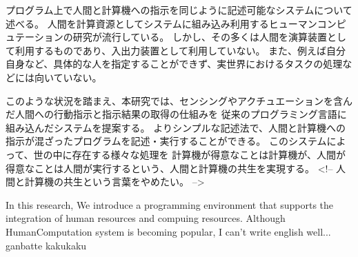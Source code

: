 \begin{jabstract}

プログラム上で人間と計算機への指示を同じように記述可能なシステムについて述べる。
人間を計算資源としてシステムに組み込み利用するヒューマンコンピュテーションの研究が流行している。
しかし、その多くは人間を演算装置として利用するものであり、入出力装置として利用していない。
また、例えば自分自身など、具体的な人を指定することができず、実世界におけるタスクの処理などには向いていない。

このような状況を踏まえ、本研究では、センシングやアクチュエーションを含んだ人間への行動指示と指示結果の取得の仕組みを
従来のプログラミング言語に組み込んだシステムを提案する。
よりシンプルな記述法で、人間と計算機への指示が混ざったプログラムを記述・実行することができる。
このシステムによって、世の中に存在する様々な処理を
計算機が得意なことは計算機が、人間が得意なことは人間が実行するという、人間と計算機の共生を実現する。
<!-- 人間と計算機の共生という言葉をやめたい。 -->

\end{jabstract}

\begin{eabstract}

In this research, We introduce a programming environment that supports the integration of human resources and compuing resources.
Although HumanComputation system is becoming popular,
I can't write english well...
ganbatte kakukaku

\end{eabstract}
